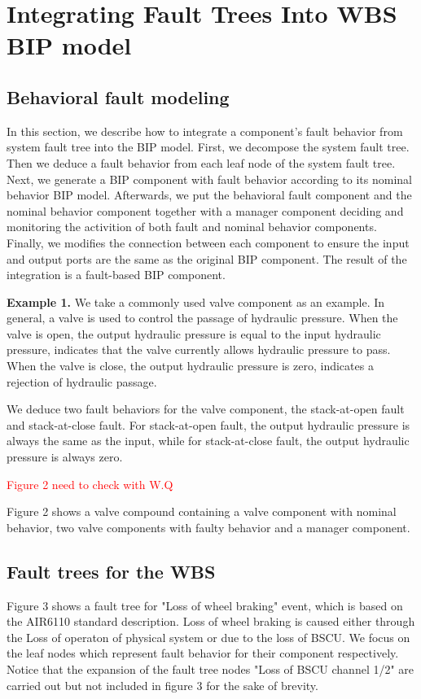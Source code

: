 \documentclass[conference]{IEEEtran}
\begin{document}
\section{Integrating Fault Trees Into WBS BIP model}

\subsection{Behavioral fault modeling}
In this section, we describe how to integrate a component's fault behavior from system fault tree into the BIP model. First, we decompose the system fault tree. Then we deduce a fault behavior from each leaf node of the system fault tree. Next, we generate a BIP component with fault behavior according to its nominal behavior BIP model. Afterwards, we put the behavioral fault component and the nominal behavior component together with a manager component deciding and monitoring the activition of both fault and nominal behavior components. Finally, we modifies the connection between each component to ensure the input and output ports are the same as the original BIP component. The result of the integration is a fault-based BIP component.

\textbf{Example 1.} We take a commonly used valve component as an example. In general, a valve is used to control the passage of hydraulic pressure. When the valve is open, the output hydraulic pressure is equal to the input hydraulic pressure, indicates that the valve currently allows hydraulic pressure to pass. When the valve is close, the output hydraulic pressure is zero, indicates a rejection of hydraulic passage.

We deduce two fault behaviors for the valve component, the stack-at-open fault and stack-at-close fault. For stack-at-open fault, the output hydraulic pressure is always the same as the input, while for stack-at-close fault, the output hydraulic pressure is always zero.

\textcolor{red}{
	Figure 2 need to check with W.Q
}

Figure 2 shows a valve compound containing a valve component with nominal behavior, two valve components with faulty behavior and a manager component.

\subsection{Fault trees for the WBS}
Figure 3 shows a fault tree for "Loss of wheel braking" event, which is based on the AIR6110 standard description. Loss of wheel braking is caused either through the Loss of operaton of physical system or due to the loss of BSCU. We focus on the leaf nodes which represent fault behavior for their component respectively. Notice that the expansion of the fault tree nodes "Loss of BSCU channel 1/2" are carried out but not included in figure 3 for the sake of brevity. 
\end{document}
